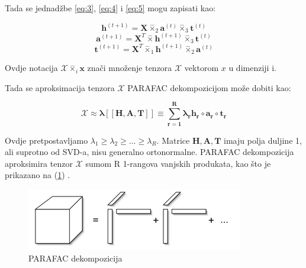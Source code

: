 \documentclass[11pt]{article}
\begin{document}
\begin{flushleft}
Tada se jednadžbe \ref{eq:3}, \ref{eq:4} i \ref{eq:5} mogu zapisati kao:
\end{flushleft}
\begin{equation}
    \boldsymbol{h}^{(t+1)} = \boldsymbol{X} \overset{-}{\times}_{2} \boldsymbol{a}^{(t)}  \overset{-}{\times}_{3} \boldsymbol{t}^{(t)}
\end{equation}
\begin{equation}
    \boldsymbol{a}^{(t+1)} = \boldsymbol{X}^{T}\overset{-}{\times} \boldsymbol{h}^{(t+1)} \overset{-}{\times}_{3} \boldsymbol{t}^{(t)}
\end{equation}
\begin{equation}
    \boldsymbol{t}^{(t+1)} = \boldsymbol{X}^{T}\overset{-}{\times}_{1} \boldsymbol{h}^{(t+1)} \overset{-}{\times}_{2} \boldsymbol{a}^{(t)}
\end{equation}

\begin{flushleft}
Ovdje notacija $\boldsymbol{\mathcal{X}}\overset{-}{\times}_{i} \boldsymbol{x}$ znači množenje  tenzora $\boldsymbol{\mathcal{X}}$ vektorom $x$ u dimenziji i.
\end{flushleft}
\begin{flushleft}
Tada se aproksimacija tenzora $\boldsymbol{\mathcal{X}}$ PARAFAC dekompozicijom može dobiti kao:
\end{flushleft}
\begin{equation}
    \boldsymbol{\mathcal{X} \approx \lambda [\![ H, A, T ]\!] \equiv \sum_{r = 1}^{R} \lambda_{r} h_{r} \circ a_{r} \circ t_{r}}
\end{equation}

\begin{raggedleft}
Ovdje pretpostavljamo $\lambda_{1} \ge \lambda_{2} \ge \ldots \ge \lambda_{R}$.
Matrice $\boldsymbol{H, A, T}$ imaju polja duljine 1, ali suprotno od SVD-a, nisu generalno ortonormalne. PARAFAC dekompozicija aproksimira tenzor $\boldsymbol{\mathcal{X}}$ sumom R 1-rangova vanjskih produkata, kao što je  prikazano na (\ref{fig:3}) .
\end{raggedleft}

\begin{figure}[hbt!]
    \centering
    \includegraphics[width= \textwidth]{parafac.png}  
    \caption{PARAFAC dekompozicija}
    \label{fig:3}
\end{figure}
\end{document}
